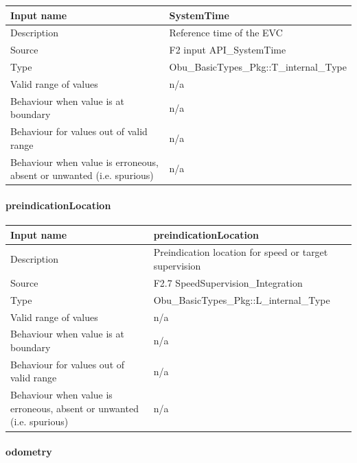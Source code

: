 \begin{longtable}{p{}p{}}
\toprule
Input name				& SystemTime\\
\midrule
Description				& Reference time of the EVC\\
\midrule
Source					& F2 input API\_SystemTime \\ 
\midrule
Type					& Obu\_BasicTypes\_Pkg::T\_internal\_Type\\
\midrule
Valid range of values	& n/a \\
\midrule
Behaviour when value is at boundary	& n/a\\
\midrule
Behaviour for values out of valid range	& n/a\\
\midrule
Behaviour when value is erroneous, absent or unwanted (i.e. spurious) & n/a\\

\bottomrule

\end{longtable}

\paragraph{preindicationLocation}

\begin{longtable}{p{}p{}}
\toprule
Input name				& preindicationLocation\\
\midrule
Description				& Preindication location for speed or target supervision \\
\midrule
Source					& F2.7 SpeedSupervision\_Integration \\ 
\midrule
Type					& Obu\_BasicTypes\_Pkg::L\_internal\_Type\\
\midrule
Valid range of values	& n/a \\
\midrule
Behaviour when value is at boundary	& n/a\\
\midrule
Behaviour for values out of valid range	& n/a\\
\midrule
Behaviour when value is erroneous, absent or unwanted (i.e. spurious) & n/a\\

\bottomrule


\end{longtable}

\paragraph{odometry}

